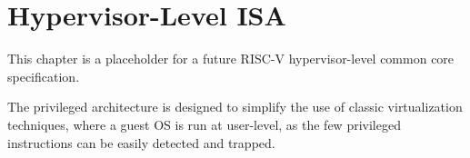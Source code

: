 \chapter{Hypervisor-Level ISA}
\label{hypervisor}

This chapter is a placeholder for a future RISC-V hypervisor-level
common core specification.

\begin{commentary}
The privileged architecture is designed to simplify the use of classic
virtualization techniques, where a guest OS is run at user-level, as
the few privileged instructions can be easily detected and trapped.
\end{commentary}

